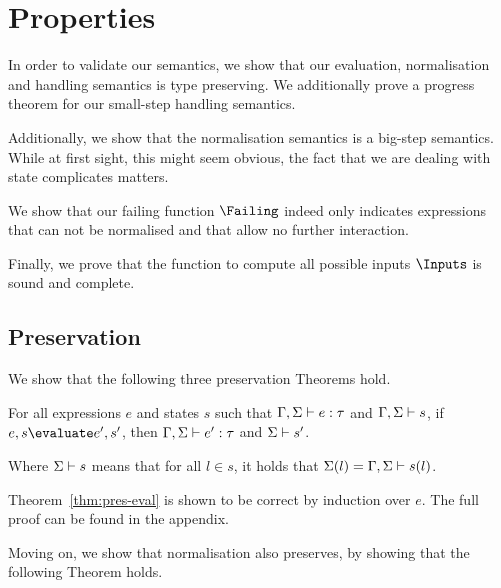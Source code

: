 


\section{Properties}
\label{sec:properties}




In order to validate our semantics, we show that our evaluation, normalisation
and handling semantics is type preserving. We additionally prove a progress
theorem for our small-step handling semantics.

Additionally, we show that the normalisation semantics is a big-step semantics.
While at first sight, this might seem obvious, the fact that we are dealing with
state complicates matters.

We show that our failing function $\Failing$ indeed only indicates expressions
that can not be normalised and that allow no further interaction.

Finally, we prove that the function to compute all possible inputs $\Inputs$ is sound and complete.



\subsection{Preservation}
\label{sub:preservation}

We show that the following three preservation Theorems hold.

\begin{theorem}
  For all expressions $e$ and states $s$
  such that $\Gamma,\Sigma \vdash e:\tau$ and $\Gamma,\Sigma \vdash s$,
  if $e,s \evaluate e',s'$,
  then $\Gamma,\Sigma \vdash e':\tau$ and $\Sigma \vdash s'$.
  \label{thm:pres-eval}
\end{theorem}

Where $\Sigma \vdash s$ means that for all $l\in s$, it holds that
$\Sigma(l)=\Gamma,\Sigma\vdash s(l)$.

Theorem~\ref{thm:pres-eval} is shown to be correct by induction over $e$. The full
proof can be found in the appendix.


Moving on, we show that normalisation also preserves, by showing that the
following Theorem holds.


